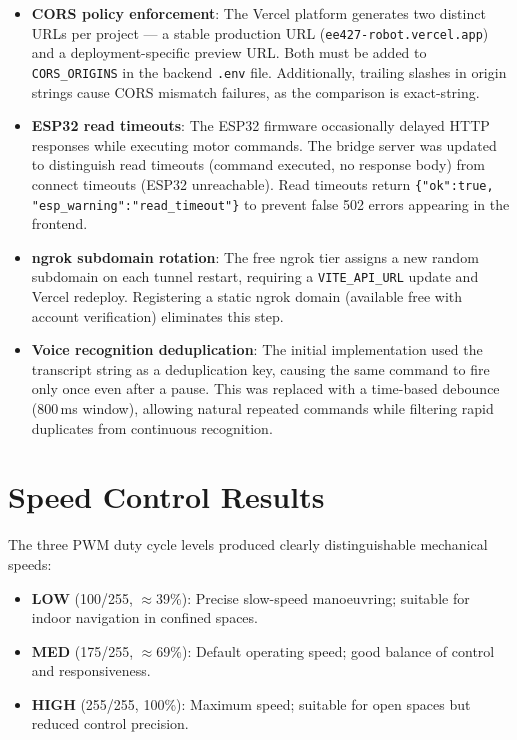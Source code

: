 \documentclass[12pt]{report}
\begin{document}
\begin{itemize}
    \item \textbf{CORS policy enforcement}: The Vercel platform generates two
          distinct URLs per project --- a stable production URL
          (\texttt{ee427-robot.vercel.app}) and a deployment-specific preview
          URL. Both must be added to \texttt{CORS\_ORIGINS} in the backend
          \texttt{.env} file. Additionally, trailing slashes in origin strings
          cause CORS mismatch failures, as the comparison is exact-string.

    \item \textbf{ESP32 read timeouts}: The ESP32 firmware occasionally delayed
          HTTP responses while executing motor commands. The bridge server was
          updated to distinguish read timeouts (command executed, no response
          body) from connect timeouts (ESP32 unreachable). Read timeouts return
          \texttt{\{"ok":true, "esp\_warning":"read\_timeout"\}} to prevent false
          502 errors appearing in the frontend.

    \item \textbf{ngrok subdomain rotation}: The free ngrok tier assigns a new
          random subdomain on each tunnel restart, requiring a
          \texttt{VITE\_API\_URL} update and Vercel redeploy. Registering a
          static ngrok domain (available free with account verification)
          eliminates this step.

    \item \textbf{Voice recognition deduplication}: The initial implementation
          used the transcript string as a deduplication key, causing the same
          command to fire only once even after a pause. This was replaced with
          a time-based debounce (800\,ms window), allowing natural repeated
          commands while filtering rapid duplicates from continuous recognition.
\end{itemize}

\section{Speed Control Results}

The three PWM duty cycle levels produced clearly distinguishable mechanical
speeds:

\begin{itemize}
    \item \textbf{LOW} (100/255, $\approx$39\%): Precise slow-speed manoeuvring;
          suitable for indoor navigation in confined spaces.
    \item \textbf{MED} (175/255, $\approx$69\%): Default operating speed;
          good balance of control and responsiveness.
    \item \textbf{HIGH} (255/255, 100\%): Maximum speed; suitable for open
          spaces but reduced control precision.
\end{itemize}
\end{document}
